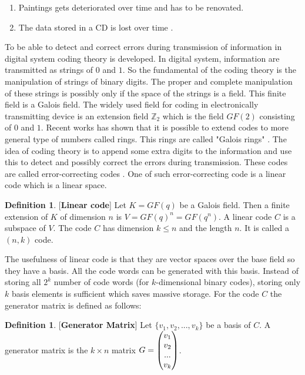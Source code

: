 \documentclass[a4paper,twoside,10pt]{article}
\theoremstyle{plain}
\theoremstyle{definition}
\newtheorem{definition}[theorem]{Definition}
\begin{document}
\begin{enumerate}
\item Paintings gets deteriorated over time and has to be renovated.
\item The data stored in a CD is lost over time \cite{coding}.
\end{enumerate}

\noindent
To be able to detect and correct errors during transmission of information in digital system coding theory is developed. In digital system, information are transmitted as strings of \(0\) and \(1\). So the fundamental of the coding theory is the manipulation of strings of binary digits. The proper and complete manipulation of these strings is possibly only if the space of the strings is a field. This finite field is a Galois field. The widely used field for coding in electronically transmitting device is an extension field \({\mathbb{Z}}_2\) which is the field \(GF(2)\) consisting of \(0\) and \(1\). Recent works has shown that it is possible to extend codes to more general type of numbers called rings. This rings are called "Galois rings" \cite{error_correct}. The idea of coding theory is to append some extra digits to the information and use this to detect and possibly correct the errors during transmission. These codes are called error-correcting codes \cite{coding}. One of such error-correcting code is a linear code which is a linear space.

\begin{definition} \cite{error_correct} [\textbf{Linear code}]
  \label{linear}
Let \(K=GF(q)\) be a Galois field. Then a finite extension of \(K\) of dimension \(n\) is \(V=GF(q)^n=GF(q^n)\). A linear code \(C\) is a subspace of \(V\). The code \(C\) has dimension \(k \leq n\) and the length \(n\). It is called a \((n,k)\) code.
\end{definition}

\noindent
The usefulness of linear code is that they are vector spaces over the base field so they have a basis. All the code words can be generated with this basis. Instead of storing all \(2^k\) number of code words (for \(k\)-dimensional binary codes), storing only \(k\) basis elements is sufficient which saves massive storage. For the code \(C\) the generator matrix is defined as follows:

\begin{definition} \cite{error_correct} [\textbf{Generator Matrix}]
  Let \(\{v_1, v_2,...,v_k\}\) be a basis of \(C\). A generator matrix is the \(k \times n\) matrix \(G=\begin{pmatrix} \small
      v_1\\
      v_2\\
      ...\\
      v_k
    \end{pmatrix}
  \).
\end{definition}
\end{document}
